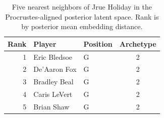 \begin{table}[htbp]
  \centering\small
  \begin{tabular}{rllc}
    \toprule
    Rank & Player & Position & Archetype \\
    \midrule
    1 & Eric Bledsoe & G & 2 \\
    2 & De'Aaron Fox & G & 2 \\
    3 & Bradley Beal & G & 2 \\
    4 & Caris LeVert & G & 2 \\
    5 & Brian Shaw & G & 2 \\
    \bottomrule
  \end{tabular}
  \caption{Five nearest neighbors of Jrue Holiday in the Procrustes-aligned posterior latent space. Rank is by posterior mean embedding distance.}
  \label{tab:Jrue_Holiday_neighbors}
\end{table}

